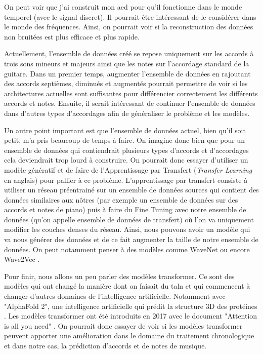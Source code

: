 On peut voir que j'ai construit mon \gls{aed} pour qu'il fonctionne dans le monde temporel (avec le signal discret). Il pourrait être intéressant de le considérer dans le monde des fréquences. Ainsi, on pourrait voir si la reconstruction des données non bruitées est plus efficace et plus rapide.

Actuellement, l'ensemble de données créé se repose uniquement sur les accords à trois sons mineurs et majeurs ainsi que les notes sur l'accordage standard de la guitare. Dans un premier temps, augmenter l'ensemble de données en rajoutant des accords septièmes, diminués et augmentés pourrait permettre de voir si les architectures actuelles sont suffisantes pour différencier correctement les différents accords et notes. Ensuite, il serait intéressant de continuer l'ensemble de données dans d'autres types d'accordages afin de généraliser le problème et les modèles.

Un autre point important est que l'ensemble de données actuel, bien qu'il soit petit, m'a pris beaucoup de temps à faire. On imagine donc bien que pour un ensemble de données qui contiendrait plusieurs types d'accords et d'accordages cela deviendrait trop lourd à construire. On pourrait donc essayer d'utiliser un modèle génératif et de faire de l'Apprentissage par Transfert (\textit{Transfer Learning} en anglais) pour pallier à ce problème. L'apprentissage par transfert consiste à utiliser un réseau préentrainé sur un ensemble de données sources qui contient des données similaires aux nôtres (par exemple un ensemble de données sur des accords et notes de piano) puis à faire du Fine Tuning avec notre ensemble de données (qu'on appelle ensemble de données de transfert) où l'on va uniquement modifier les couches denses du réseau. Ainsi, nous pouvons avoir un modèle qui va nous générer des données et de ce fait augmenter la taille de notre ensemble de données. On peut notamment penser à des modèles comme WaveNet \parencite{oord_wavenet_2016} ou encore Wave2Vec \parencite{baevski_wav2vec_2020}.

Pour finir, nous allons un peu parler des modèles transformer. Ce sont des modèles qui ont changé la manière dont on faisait du \gls{taln} et qui commencent à changer d'autres domaines de l'intelligence artificielle. Notamment avec "AlphaFold 2", une intelligence artificielle qui prédit la structure 3D des protéines \parencite{noauthor_alphafold_nodate}. Les modèles transformer ont été introduits en 2017 avec le document "Attention is all you need" \parencite{vaswani_attention_2017}. On pourrait donc essayer de voir si les modèles transformer peuvent apporter une amélioration dans le domaine du traitement chronologique et dans notre cas, la prédiction d'accords et de notes de musique.